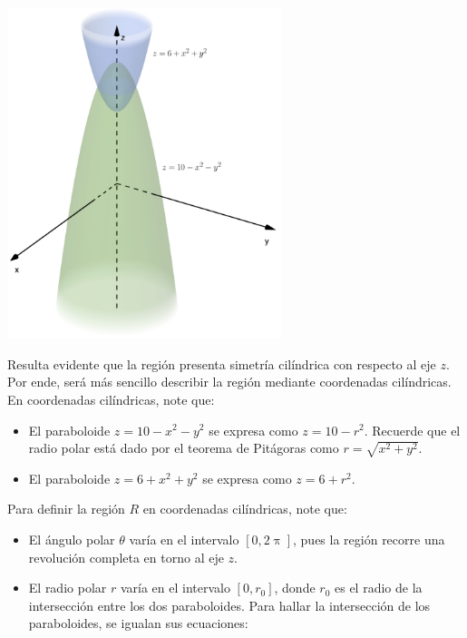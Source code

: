 \documentclass{fmbvecto}
\begin{document}
\begin{problema}
\begin{center}
    \includegraphics[width=0.6\textwidth]{interseccion-paraboloides.png}
    \label{fig:interseccion-paraboloides}
\end{center}
\vspace*{1em}
Resulta evidente que la región presenta simetría cilíndrica con respecto al eje \(z\). Por ende, será más sencillo describir la región mediante coordenadas cilíndricas. En coordenadas cilíndricas, note que:
\begin{itemize}
    \item El paraboloide \(z = 10 - x^2 - y^2\) se expresa como \(z = 10 - r^2\). Recuerde que el radio polar está dado por el teorema de Pitágoras como \(r = \sqrt{x^2 + y^2}\).
    \item El paraboloide \(z = 6 + x^2 + y^2\) se expresa como \(z = 6 + r^2\).
\end{itemize}
\vspace*{1em}
Para definir la región \(R\) en coordenadas cilíndricas, note que:
\begin{itemize}
    \item El ángulo polar \(\theta\) varía en el intervalo \([0, 2\uppi]\), pues la región recorre una revolución completa en torno al eje \(z\).
    \item El radio polar \(r\) varía en el intervalo \([0, r_0]\), donde \(r_0\) es el radio de la intersección entre los dos paraboloides. Para hallar la intersección de los paraboloides, se igualan sus ecuaciones:
    \begin{align*}

\end{align*}
\end{itemize}
\end{problema}
\end{document}
